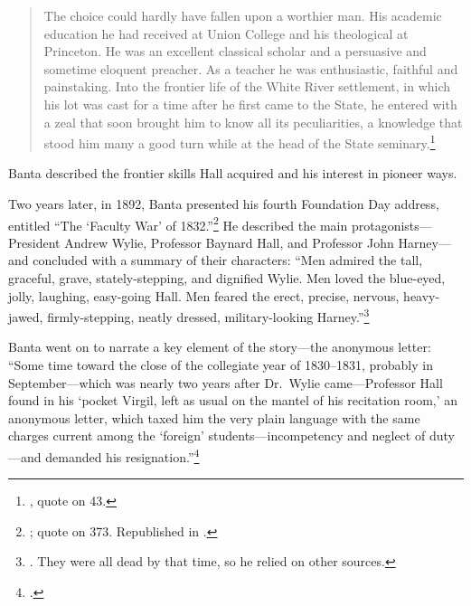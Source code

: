 \documentclass[
  american,
  letterpaper,
]{scrreprt}
\begin{document}
\begin{quote}
The choice could hardly have fallen upon a worthier man. His academic
education he had received at Union College and his theological at
Princeton. He was an excellent classical scholar and a persuasive and
sometime eloquent preacher. As a teacher he was enthusiastic, faithful
and painstaking. Into the frontier life of the White River settlement,
in which his lot was cast for a time after he first came to the State,
he entered with a zeal that soon brought him to know all its
peculiarities, a knowledge that stood him many a good turn while at the
head of the State seminary.\footnote{,
  quote on 43.}
\end{quote}

Banta described the frontier skills Hall acquired and his interest in
pioneer ways.

Two years later, in 1892, Banta presented his fourth Foundation Day
address, entitled ``The `Faculty War' of 1832.''\footnote{; quote on 373. Republished
  in .} He described the main
protagonists---President Andrew Wylie, Professor Baynard Hall, and
Professor John Harney---and concluded with a summary of their
characters: ``Men admired the tall, graceful, grave, stately-stepping,
and dignified Wylie. Men loved the blue-eyed, jolly, laughing,
easy-going Hall. Men feared the erect, precise, nervous, heavy-jawed,
firmly-stepping, neatly dressed, military-looking Harney.''\footnote{. They were all dead by
  that time, so he relied on other sources.}

Banta went on to narrate a key element of the story---the anonymous
letter: ``Some time toward the close of the collegiate year of
1830--1831, probably in September---which was nearly two years after
Dr.~Wylie came---Professor Hall found in his `pocket Virgil, left as
usual on the mantel of his recitation room,' an anonymous letter, which
taxed him the very plain language with the same charges current among
the `foreign' students---incompetency and neglect of duty---and demanded
his resignation.''\footnote{.}
\end{document}
